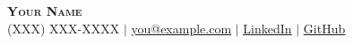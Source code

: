 \begin{center}
    \textbf{\Huge \scshape Your Name} \\ \vspace{1pt}
    \small (XXX) XXX-XXXX $|$ \href{mailto:you@example.com}{\underline{you@example.com}} $|$ \href{https://linkedin.com/in/yourprofile}{\underline{LinkedIn}} $|$
    \href{https://github.com/yourusername}{\underline{GitHub}}
\end{center}
